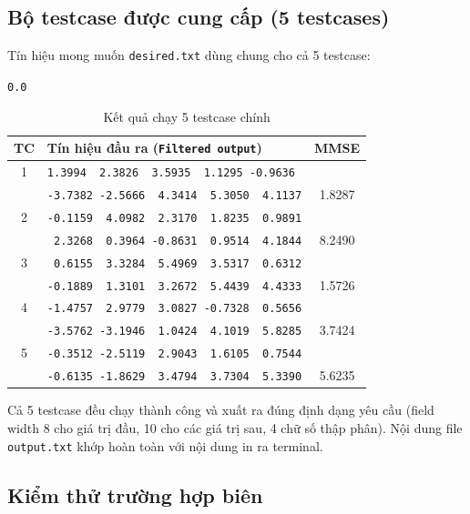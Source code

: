 \documentclass[twoside,final]{hcmut-report}
\begin{document}
\subsection{Bộ testcase được cung cấp (5 testcases)}

Tín hiệu mong muốn \texttt{desired.txt} dùng chung cho cả 5 testcase:
\begin{center}
  \texttt{0.0         }
\end{center}

\begin{table}[H]
  \centering
  \caption{Kết quả chạy 5 testcase chính}
  \label{tab:tc-results}
  \begin{tabularx}{\linewidth}{cXc}
    \toprule
    \textbf{TC} & \textbf{Tín hiệu đầu ra (\texttt{Filtered output})} & \textbf{MMSE} \\
    \midrule
    1 & \texttt{1.3994\ \ 2.3826\ \ 3.5935\ \ 1.1295\ -0.9636}\\
      & \texttt{-3.7382\ -2.5666\ \ 4.3414\ \ 5.3050\ \ 4.1137} & 1.8287 \\
    \midrule
    2 & \texttt{-0.1159\ \ 4.0982\ \ 2.3170\ \ 1.8235\ \ 0.9891}\\
      & \texttt{\ 2.3268\ \ 0.3964\ -0.8631\ \ 0.9514\ \ 4.1844} & 8.2490 \\
    \midrule
    3 & \texttt{\ 0.6155\ \ 3.3284\ \ 5.4969\ \ 3.5317\ \ 0.6312}\\
      & \texttt{-0.1889\ \ 1.3101\ \ 3.2672\ \ 5.4439\ \ 4.4333} & 1.5726 \\
    \midrule
    4 & \texttt{-1.4757\ \ 2.9779\ \ 3.0827\ -0.7328\ \ 0.5656}\\
      & \texttt{-3.5762\ -3.1946\ \ 1.0424\ \ 4.1019\ \ 5.8285} & 3.7424 \\
    \midrule
    5 & \texttt{-0.3512\ -2.5119\ \ 2.9043\ \ 1.6105\ \ 0.7544}\\
      & \texttt{-0.6135\ -1.8629\ \ 3.4794\ \ 3.7304\ \ 5.3390} & 5.6235 \\
    \bottomrule
  \end{tabularx}
\end{table}

Cả 5 testcase đều chạy thành công và xuất ra đúng định dạng yêu cầu
(field width 8 cho giá trị đầu, 10 cho các giá trị sau, 4 chữ số thập
phân). Nội dung file \texttt{output.txt} khớp hoàn toàn với nội dung
in ra terminal.

\subsection{Kiểm thử trường hợp biên}
\end{document}
